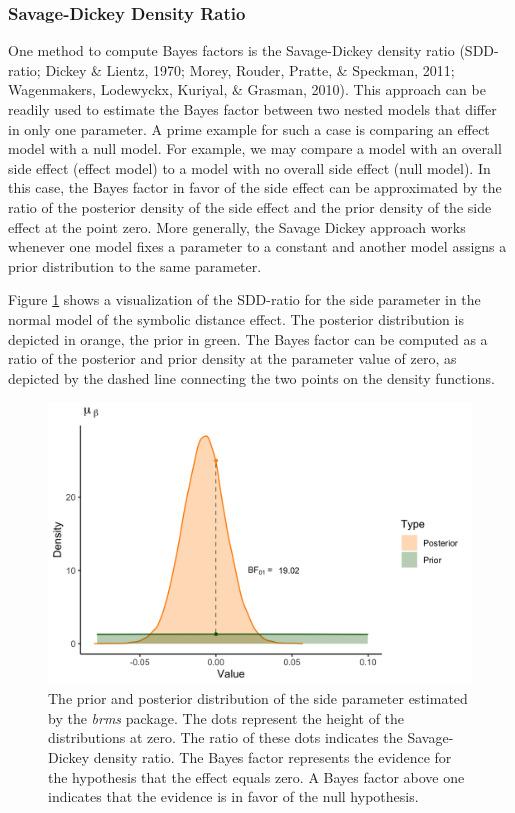 \documentclass[
  english,
  doc,floatsintext]{apa6}
\begin{document}
\hypertarget{savage-dickey-density-ratio}{%
\subsubsection{Savage-Dickey Density Ratio}\label{savage-dickey-density-ratio}}

One method to compute Bayes factors is the Savage-Dickey density ratio (SDD-ratio; Dickey \& Lientz, 1970; Morey, Rouder, Pratte, \& Speckman, 2011; Wagenmakers, Lodewyckx, Kuriyal, \& Grasman, 2010). This approach can be readily used to estimate the Bayes factor between two nested models that differ in only one parameter. A prime example for such a case is comparing an effect model with a null model. For example, we may compare a model with an overall side effect (effect model) to a model with no overall side effect (null model). In this case, the Bayes factor in favor of the side effect can be approximated by the ratio of the posterior density of the side effect and the prior density of the side effect at the point zero. More generally, the Savage Dickey approach works whenever one model fixes a parameter to a constant and another model assigns a prior distribution to the same parameter.

Figure \ref{fig:sdratioplotall} shows a visualization of the SDD-ratio for the side parameter in the normal model of the symbolic distance effect. The posterior distribution is depicted in orange, the prior in green. The Bayes factor can be computed as a ratio of the posterior and prior density at the parameter value of zero, as depicted by the dashed line connecting the two points on the density functions.

\begin{figure}[H]

\includegraphics[width=0.6\linewidth]{Images/Fig16_sdrplotside_v2} \hfill{}

\caption{The prior and posterior distribution of the side parameter estimated by the \textit{brms} package. The dots represent the height of the distributions at zero. The ratio of these dots indicates the Savage-Dickey density ratio. The Bayes factor represents the evidence for the hypothesis that the effect equals zero. A Bayes factor above one indicates that the evidence is in favor of the null hypothesis.}\label{fig:sdratioplotall}
\end{figure}
\end{document}

